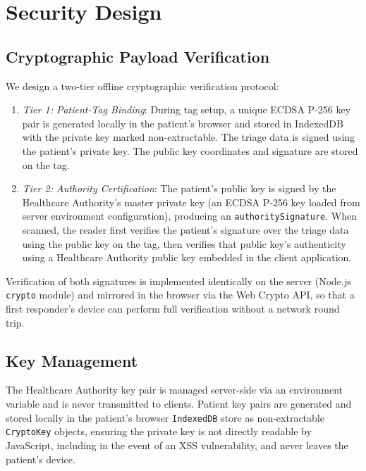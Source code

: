 \documentclass[conference]{IEEEtran}
\begin{document}
\section{Security Design}
\subsection{Cryptographic Payload Verification}
We design a two-tier offline cryptographic verification protocol:
\begin{enumerate}
\item \textit{Tier 1: Patient-Tag Binding}: During tag setup, a unique ECDSA P-256 key pair is generated locally in the patient's browser and stored in IndexedDB with the private key marked non-extractable. The triage data is signed using the patient's private key. The public key coordinates and signature are stored on the tag.
\item \textit{Tier 2: Authority Certification}: The patient's public key is signed by the Healthcare Authority's master private key (an ECDSA P-256 key loaded from server environment configuration), producing an \texttt{authoritySignature}. When scanned, the reader first verifies the patient's signature over the triage data using the public key on the tag, then verifies that public key's authenticity using a Healthcare Authority public key embedded in the client application.
\end{enumerate}
Verification of both signatures is implemented identically on the server (Node.js \texttt{crypto} module) and mirrored in the browser via the Web Crypto API, so that a first responder's device can perform full verification without a network round trip.

\subsection{Key Management}
The Healthcare Authority key pair is managed server-side via an environment variable and is never transmitted to clients. Patient key pairs are generated and stored locally in the patient's browser \texttt{IndexedDB} store as non-extractable \texttt{CryptoKey} objects, ensuring the private key is not directly readable by JavaScript, including in the event of an XSS vulnerability, and never leaves the patient's device.
\end{document}
